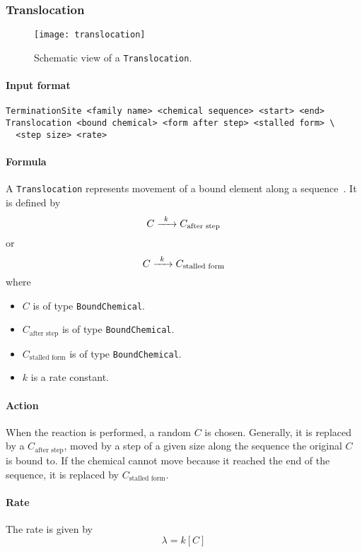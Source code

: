 \subsubsection{Translocation}

\begin{figure}[!h]
  \centering
  \texttt{[image: translocation]}
  \caption{Schematic view of a \texttt{Translocation}.}
  \label{fig:translocation}
\end{figure}

\paragraph{Input format}
\begin{verbatim}
TerminationSite <family name> <chemical sequence> <start> <end>
Translocation <bound chemical> <form after step> <stalled form> \
  <step size> <rate>
\end{verbatim}

\paragraph{Formula} A \texttt{Translocation} represents movement of a bound element along a sequence~. It is defined by
\[
	\reactionIrr{C}{C_\text{after step}}{k}{}
\]
or
\[
	\reactionIrr{C}{C_\text{stalled form}}{k}{}
\]
where
\begin{itemize}
	\item $C$ is of type \texttt{BoundChemical}.
	\item $C_\text{after step}$ is of type \texttt{BoundChemical}.
	\item $C_\text{stalled form}$ is of type \texttt{BoundChemical}.
	\item $k$ is a rate constant.
\end{itemize}

\paragraph{Action} When the reaction is performed, a random $C$ is chosen. Generally, it is replaced by a $C_\text{after step}$, moved by a step of a given size along the sequence the original $C$ is bound to. If the chemical cannot move because it reached the end of the sequence, it is replaced by $C_\text{stalled form}$.

\paragraph{Rate} The rate is given by
\[
	\lambda = k [C]
\]

